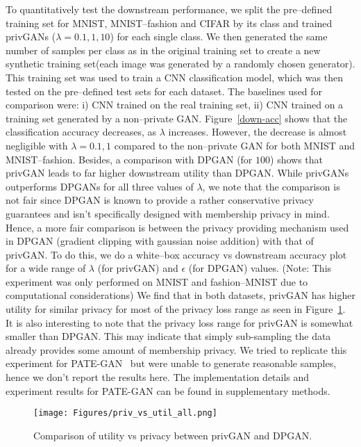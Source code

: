 \documentclass{article}
\begin{document}
To quantitatively test the downstream performance, we split the pre--defined training set for MNIST, MNIST--fashion and CIFAR by its class and trained privGANs ($\lambda = 0.1, 1, 10$) for each single class. We then generated the same number of samples per class as in the original training set to create a new synthetic training set(each image was generated by a randomly chosen generator). This training set was used to train a CNN classification model, which was then tested on the pre--defined test sets for each dataset. The baselines used for comparison were: i) CNN trained on the real training set, ii) CNN trained on a training set generated by a non--private GAN. Figure~\ref{down-acc} shows that the classification accuracy decreases, as $\lambda$ increases. However, the decrease is almost negligible with $\lambda=0.1,1$ compared to the non--private GAN for both MNIST and MNIST--fashion. Besides, a comparison with DPGAN (for $100$) shows that privGAN leads to far higher downstream utility than DPGAN. While privGANs outperforms DPGANs for all three values of $\lambda$, we note that the comparison is not fair since DPGAN is known to provide a rather conservative privacy guarantees and isn't specifically designed with membership privacy in mind. Hence, a more fair comparison is between the privacy providing mechanism used in DPGAN (gradient clipping with gaussian noise addition) with that of privGAN. To do this, we do a white--box accuracy vs downstream accuracy plot for a wide range of $\lambda$ (for privGAN) and $\epsilon$ (for DPGAN) values. (Note: This experiment was only performed on MNIST and fashion--MNIST due to computational considerations) We find that in both datasets, privGAN has higher utility for similar privacy for most of the privacy loss range as seen in Figure~\ref{priv-util}. It is also interesting to note that the privacy loss range for privGAN is somewhat smaller than DPGAN. This may indicate that simply sub-sampling the data already provides some amount of membership privacy. We tried to replicate this experiment for PATE-GAN~\cite{jordon2018pate} but were unable to generate reasonable samples, hence we don't report the results here. The implementation details and experiment results for PATE-GAN can be found in supplementary methods.

\begin{figure}[h!]
    \centering
    \texttt{[image: Figures/priv\_vs\_util\_all.png]}
    \caption{Comparison of utility vs privacy between privGAN and DPGAN.}
    \label{priv-util}
\end{figure}
\end{document}

